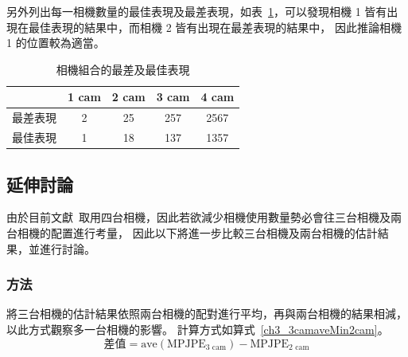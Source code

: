 另外列出每一相機數量的最佳表現及最差表現，如表~\ref{ch3_best_worst_camset}，可以發現相機 1 皆有出現在最佳表現的結果中，而相機 2 皆有出現在最差表現的結果中，
因此推論相機 1 的位置較為適當。
\begin{table}[!ht]
   \caption[相機組合的最差及最佳表現]{相機組合的最差及最佳表現}
   \centering
   \label{ch3_best_worst_camset}
   \setlength{\tabcolsep}{3pt}
   \renewcommand\arraystretch{1.5}
   \begin{tabular}{c|c|c|c|c}
       & 1 cam & 2 cam & 3 cam & 4 cam \\ 
      \midrule[2pt]
      最差表現 & 2 & 25 & 257 & 2567 \\
      最佳表現 & 1 & 18 & 137 & 1357 \\
   \end{tabular}
\end{table}

\subsection{延伸討論}
由於目前文獻~\cite{zhang2020fusing}取用四台相機，因此若欲減少相機使用數量勢必會往三台相機及兩台相機的配置進行考量，
因此以下將進一步比較三台相機及兩台相機的估計結果，並進行討論。

\subsubsection{方法}
將三台相機的估計結果依照兩台相機的配對進行平均，再與兩台相機的結果相減，以此方式觀察多一台相機的影響。
計算方式如算式~\ref{ch3_3camaveMin2cam}。
\begin{equation}
   \label{ch3_3camaveMin2cam}
   \text{差值} = \text{ave}(\text{MPJPE}_{3 \text{ cam}})-\text{MPJPE}_{2 \text{ cam}}
\end{equation}


